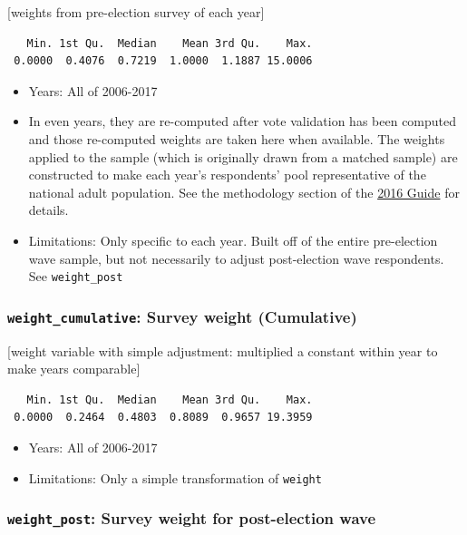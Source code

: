 \documentclass[10pt,article,oneside]{memoir}
\theoremstyle{definition}
\begin{document}
{[}weights from pre-election survey of each year{]}

\begin{verbatim}
   Min. 1st Qu.  Median    Mean 3rd Qu.    Max. 
 0.0000  0.4076  0.7219  1.0000  1.1887 15.0006 
\end{verbatim}

\begin{itemize}
\tightlist
\item
  Years: All of 2006-2017
\item
  In even years, they are re-computed after vote validation has been
  computed and those re-computed weights are taken here when available.
  The weights applied to the sample (which is originally drawn from a
  matched sample) are constructed to make each year's respondents' pool
  representative of the national adult population. See the methodology
  section of the
  \href{https://dataverse.harvard.edu/api/access/datafile/3047286}{2016
  Guide} for details.
\item
  Limitations: Only specific to each year. Built off of the entire
  pre-election wave sample, but not necessarily to adjust post-election
  wave respondents. See \texttt{weight\_post}
\end{itemize}

\subsubsection{\texorpdfstring{\texttt{weight\_cumulative}: Survey
weight
(Cumulative)}{weight\_cumulative: Survey weight (Cumulative)}}\label{weight_cumulative-survey-weight-cumulative}

{[}weight variable with simple adjustment: multiplied a constant within
year to make years comparable{]}

\begin{verbatim}
   Min. 1st Qu.  Median    Mean 3rd Qu.    Max. 
 0.0000  0.2464  0.4803  0.8089  0.9657 19.3959 
\end{verbatim}

\begin{itemize}
\tightlist
\item
  Years: All of 2006-2017
\item
  Limitations: Only a simple transformation of \texttt{weight}
\end{itemize}

\subsubsection{\texorpdfstring{\texttt{weight\_post}: Survey weight for
post-election
wave}{weight\_post: Survey weight for post-election wave}}\label{weight_post-survey-weight-for-post-election-wave}
\end{document}
